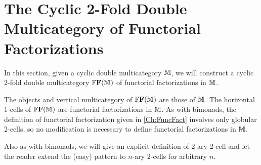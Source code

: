 \section{The Cyclic 2-Fold Double Multicategory of Functorial Factorizations}

In this section, given a cyclic double multicategory $\mathbb{M}$, we will construct a cyclic 2-fold double multicategory $\mathbb{F}\mathbf{F}(\mathbb{M})$ of functorial factorizations in $\mathbb{M}$.

The objects and vertical multicategory of $\mathbb{F}\mathbf{F}(\mathbb{M})$ are those of $\mathbb{M}$. The horizontal 1-cells of $\mathbb{F}\mathbf{F}(\mathbb{M})$ are functorial factorizations in $\mathbb{M}$. As with bimonads, the definition of functorial factorization given in \cref{Ch:FuncFact} involves only globular 2-cells, so no modification is necessary to define functorial factorizations in $\mathbb{M}$.

Also as with bimonads, we will give an explicit definition of 2-ary 2-cell and let the reader extend the (easy) pattern to $n$-ary 2-cells for arbitrary $n$.

